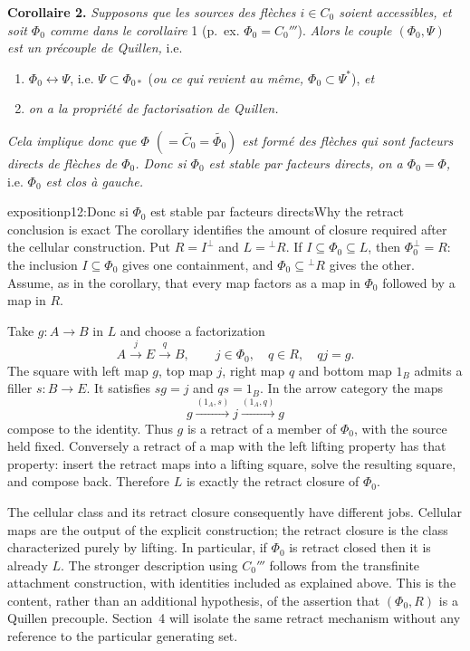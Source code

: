 \textbf{Corollaire 2.} \textit{Supposons que les sources des flèches $i\in C_0$ soient accessibles, et soit $\Phi_0$ comme dans le corollaire} 1 (p.~ex. $\Phi_0=C_0'''$). \textit{Alors le couple $(\Phi_0,\Psi)$ est un précouple de Quillen,} i.e.
\begin{enumerate}[label={}, leftmargin=*]
\item[a)] $\Phi_0\longleftrightarrow\Psi$, i.e. $\Psi\subset\Phi_{0*}$ (\textit{ou ce qui revient au même, $\Phi_0\subset\Psi^*$}), \textit{et}
\item[b)] \textit{on a la propriété de factorisation de Quillen.}
\end{enumerate}
\textit{Cela implique donc que $\Phi$ $(=\widetilde{C_0}=\widetilde{\Phi_0})$ est formé des flèches qui sont facteurs directs de flèches de $\Phi_0$. Donc si $\Phi_0$ est stable par facteurs directs, on a $\Phi_0=\Phi$,} i.e. \textit{$\Phi_0$ est clos à gauche.}

\begin{dcomment}{exposition}{p12:Donc si $\Phi_0$ est stable par facteurs directs}{Why the retract conclusion is exact}
The corollary identifies the amount of closure required after the cellular construction. Put $R=I^\perp$ and $L={}^{\perp}R$. If $I\subseteq\Phi_0\subseteq L$, then $\Phi_0^\perp=R$: the inclusion $I\subseteq\Phi_0$ gives one containment, and $\Phi_0\subseteq{}^{\perp}R$ gives the other. Assume, as in the corollary, that every map factors as a map in $\Phi_0$ followed by a map in $R$.

Take $g:A\to B$ in $L$ and choose a factorization
\[
 A\xrightarrow{j}E\xrightarrow{q}B,
 \qquad j\in\Phi_0,\quad q\in R,\quad qj=g.
\]
The square with left map $g$, top map $j$, right map $q$ and bottom map $1_B$ admits a filler $s:B\to E$. It satisfies $sg=j$ and $qs=1_B$. In the arrow category the maps
\[
 g\xrightarrow{(1_A,s)}j\xrightarrow{(1_A,q)}g
\]
compose to the identity. Thus $g$ is a retract of a member of $\Phi_0$, with the source held fixed. Conversely a retract of a map with the left lifting property has that property: insert the retract maps into a lifting square, solve the resulting square, and compose back. Therefore $L$ is exactly the retract closure of $\Phi_0$.

The cellular class and its retract closure consequently have different jobs. Cellular maps are the output of the explicit construction; the retract closure is the class characterized purely by lifting. In particular, if $\Phi_0$ is retract closed then it is already $L$. The stronger description using $C_0'''$ follows from the transfinite attachment construction, with identities included as explained above. This is the content, rather than an additional hypothesis, of the assertion that $(\Phi_0,R)$ is a Quillen precouple. Section~4 will isolate the same retract mechanism without any reference to the particular generating set.
\end{dcomment}


